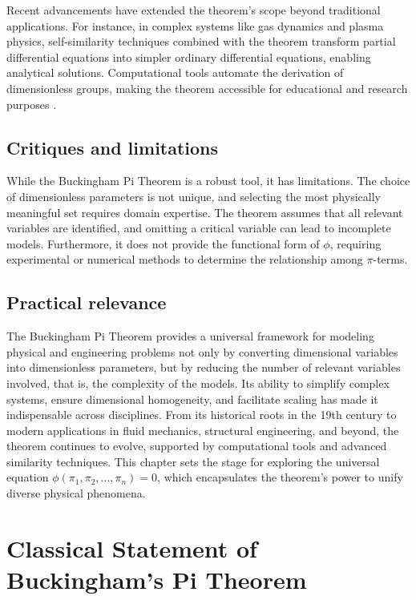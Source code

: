 Recent advancements have extended the theorem's scope beyond traditional applications. For instance, in complex systems like gas dynamics and plasma physics, self-similarity techniques combined with the theorem transform partial differential equations into simpler ordinary differential equations, enabling analytical solutions. Computational tools automate the derivation of dimensionless groups, making the theorem accessible for educational and research purposes \cite{BuckinghamPy2021}.

\subsection{Critiques and limitations}

While the Buckingham Pi Theorem is a robust tool, it has limitations. The choice of dimensionless parameters is not unique, and selecting the most physically meaningful set requires domain expertise. The theorem assumes that all relevant variables are identified, and omitting a critical variable can lead to incomplete models. Furthermore, it does not provide the functional form of \(\phi\), requiring experimental or numerical methods to determine the relationship among \(\pi\)-terms.

\subsection{Practical relevance}

The Buckingham Pi Theorem provides a universal framework for modeling physical and engineering problems not only by converting dimensional variables into dimensionless parameters, but by reducing the number of relevant variables involved, that is, the complexity of the models. Its ability to simplify complex systems, ensure dimensional homogeneity, and facilitate scaling has made it indispensable across disciplines. From its historical roots in the 19th century to modern applications in fluid mechanics, structural engineering, and beyond, the theorem continues to evolve, supported by computational tools and advanced similarity techniques. This chapter sets the stage for exploring the universal equation \(\phi(\pi_1, \pi_2, \dots, \pi_n) = 0\), which encapsulates the theorem's power to unify diverse physical phenomena.

\section{Classical Statement of Buckingham's Pi Theorem}

